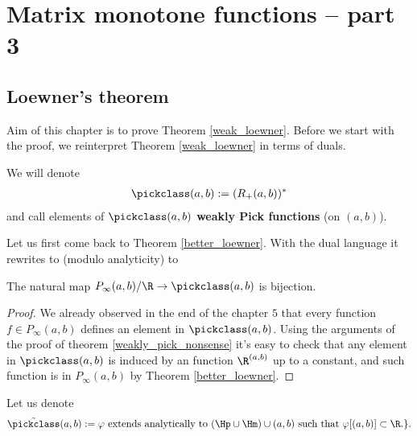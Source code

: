\chapter{Matrix monotone functions -- part 3}

\section{Loewner's theorem}

Aim of this chapter is to prove Theorem \ref{weak_loewner}. Before we start with the proof, we reinterpret Theorem \ref{weak_loewner} in terms of duals.

\begin{maar}
	We will denote
	\begin{align*}
		\pickclass(a, b) := (R_{+}(a, b))^{*}
	\end{align*}
	and call elements of $\pickclass(a, b)$ \textbf{weakly Pick functions} (on $(a, b)$).
\end{maar}

Let us first come back to Theorem \ref{better_loewner}. With the dual language it rewrites to (modulo analyticity) to
\begin{lause}\label{bester_loewner}
	The natural map $P_{\infty}(a, b)/\R \to \pickclass(a, b)$ is bijection.
\end{lause}
\begin{proof}
	We already observed in the end of the chapter $5$ that every function $f \in P_{\infty}(a, b)$ defines an element in $\pickclass(a, b)$. Using the arguments of the proof of theorem \ref{weakly_pick_nonsense} it's easy to check that any element in $\pickclass(a, b)$ is induced by an function $\R^{(a, b)}$ up to a constant, and such function is in $P_{\infty}(a, b)$ by Theorem \ref{better_loewner}.
\end{proof}

Let us denote
\begin{align*}
	\tilde{\pickclass}(a, b) := \text{$\varphi$ extends analytically to $(\Hp \cup \Hm) \cup (a, b)$ such that $\varphi[(a, b)] \subset \R.$}\}.
\end{align*}

